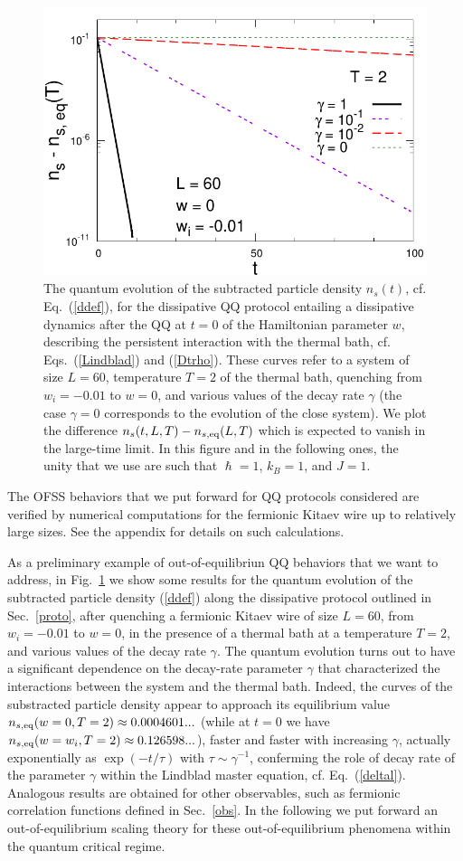 \begin{figure}[!htb]
\centering
  \includegraphics[width=0.6\columnwidth]{imm/NT2l60diffglog.pdf}
  \caption{The quantum evolution of the subtracted particle density
    $n_s(t)$, cf. Eq.~(\ref{ddef}), for the dissipative QQ protocol
    entailing a dissipative dynamics after the QQ at $t=0$ of the
    Hamiltonian parameter $w$, describing the persistent interaction
    with the thermal bath, cf.  Eqs.~(\ref{Lindblad}) and
    (\ref{Dtrho}).  These curves refer to a system of size $L=60$,
    temperature $T=2$ of the thermal bath, quenching from $w_i=-0.01$
    to $w=0$, and various values of the decay rate $\gamma$ (the case
    $\gamma=0$ corresponds to the evolution of the close system).  We
    plot the difference $n_s(t,L,T) - n_{s,{\rm eq}}(L,T)$ which is
    expected to vanish in the large-time limit.  In this figure and in
    the following ones, the unity that we use are such that
    $\hslash=1$, $k_B=1$, and $J=1$.}
  \label{plainns}
\end{figure}



The OFSS behaviors that we put forward for QQ protocols considered are
verified by numerical computations for the fermionic Kitaev wire up to
relatively large sizes. See the appendix for details on such
calculations.

As a preliminary example of out-of-equilibriun QQ
behaviors that we want to address, in Fig.~\ref{plainns} we show some
results for the quantum evolution of the subtracted particle density
(\ref{ddef}) along the dissipative protocol outlined in
Sec.~\ref{proto}, after quenching a fermionic Kitaev wire of size
$L=60$, from $w_i=-0.01$ to $w=0$, in the presence of a thermal bath
at a temperature $T=2$, and various values of the decay rate $\gamma$.
The quantum evolution turns out to have a significant dependence on
the decay-rate parameter $\gamma$ that characterized the interactions
between the system and the thermal bath. Indeed, the curves of the
substracted particle density appear to approach its equilibrium value
$n_{s,{\rm eq}}(w=0,T=2)\approx 0.0004601...$ (while at $t=0$ we have
$n_{s,{\rm eq}}(w=w_i,T=2) \approx 0.126598...$), faster and faster
with increasing $\gamma$, actually exponentially as $\exp(-t/\tau)$
with $\tau\sim\gamma^{-1}$, conferming the role of decay rate of the
parameter $\gamma$ within the Lindblad master equation,
cf. Eq.~(\ref{deltal}). Analogous results are obtained for other
observables, such as fermionic correlation functions defined in
Sec.~\ref{obs}. In the following we put forward an out-of-equilibrium
scaling theory for these out-of-equilibrium phenomena within the
quantum critical regime.




